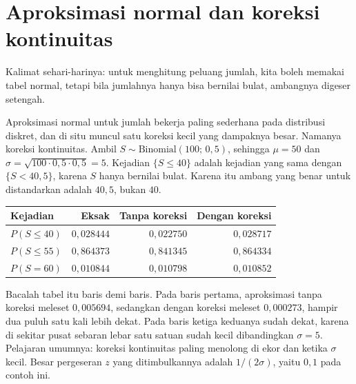 \section{Aproksimasi normal dan koreksi kontinuitas}

Kalimat sehari-harinya: untuk menghitung peluang jumlah, kita boleh memakai
tabel normal, tetapi bila jumlahnya hanya bisa bernilai bulat, ambangnya digeser
setengah.

Aproksimasi normal untuk jumlah bekerja paling sederhana pada distribusi diskret,
dan di situ muncul satu koreksi kecil yang dampaknya besar. Namanya koreksi
kontinuitas. Ambil $S\sim
\text{Binomial}(100;\,0{,}5)$, sehingga $\mu=50$ dan $\sigma=\sqrt{100\cdot0{,}5
\cdot0{,}5}=5$. Kejadian $\{S\le40\}$ adalah kejadian yang sama dengan
$\{S<40{,}5\}$, karena $S$ hanya bernilai bulat. Karena itu ambang yang benar
untuk distandarkan adalah $40{,}5$, bukan $40$.

\begin{center}
\begin{tabular}{lrrr}
\hline
Kejadian & Eksak & Tanpa koreksi & Dengan koreksi \\
\hline
$P(S\le40)$ & $0{,}028444$ & $0{,}022750$ & $0{,}028717$ \\
$P(S\le55)$ & $0{,}864373$ & $0{,}841345$ & $0{,}864334$ \\
$P(S=60)$   & $0{,}010844$ & $0{,}010798$ & $0{,}010852$ \\
\hline
\end{tabular}
\end{center}

Bacalah tabel itu baris demi baris. Pada baris pertama, aproksimasi tanpa koreksi
meleset $0{,}005694$, sedangkan dengan koreksi meleset $0{,}000273$, hampir dua
puluh satu kali lebih dekat. Pada baris ketiga keduanya sudah dekat, karena di
sekitar pusat sebaran lebar satu satuan sudah kecil dibandingkan $\sigma=5$.
Pelajaran umumnya: koreksi kontinuitas paling menolong di ekor dan ketika
$\sigma$ kecil. Besar pergeseran $z$ yang ditimbulkannya adalah $1/(2\sigma)$,
yaitu $0{,}1$ pada contoh ini.


